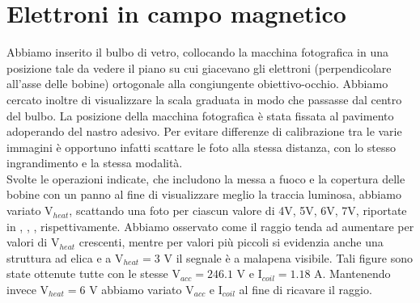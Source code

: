 \section{Elettroni in campo magnetico}
Abbiamo inserito il bulbo di vetro, collocando la macchina fotografica in una posizione tale da vedere il piano su cui giacevano gli elettroni (perpendicolare all'asse delle bobine) ortogonale alla congiungente obiettivo-occhio. Abbiamo cercato inoltre di visualizzare la scala graduata in modo che passasse dal centro del bulbo. La posizione della macchina fotografica è stata fissata al pavimento adoperando del nastro adesivo. Per evitare differenze di calibrazione tra le varie immagini è opportuno infatti scattare le foto alla stessa distanza, con lo stesso ingrandimento e la stessa modalità.\\
Svolte le operazioni indicate, che includono la messa a fuoco e la copertura delle bobine con un panno al fine di visualizzare meglio la traccia luminosa, abbiamo variato V$_{heat}$, scattando una foto per ciascun valore di 4V, 5V, 6V, 7V, riportate in , , ,  rispettivamente. Abbiamo osservato come il raggio tenda ad aumentare per valori di V$_{heat}$ crescenti, mentre per valori più piccoli si evidenzia anche una struttura ad elica e a V$_{heat} = 3$ V il segnale è a malapena visibile. Tali figure sono state ottenute tutte con le stesse V$_{acc} = 246.1$ V e I$_{coil} = 1.18$ A. Mantenendo invece V$_{heat} = 6$ V abbiamo variato V$_{acc}$ e I$_{coil}$ al fine di ricavare il raggio.\\
